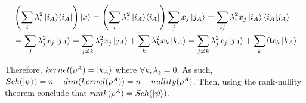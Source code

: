 \begin{enumerate}
    \begin{align}
        &\left( \sum_i \lambda_i^2 \mathop{\mathinner{ |{i_A}\rangle \langle{i_A}|}} \right) \ket{x}
        = \left( \sum_i \lambda_i^2 \mathop{\mathinner{ |{i_A}\rangle \langle{i_A}|}} \right) \sum_j x_j \ket{j_A}
        = \sum_{ij} \lambda_i^2 x_j \ket{i_A} \mathop{\mathinner{ \langle{i_A}|{j_A}\rangle}} \\
        &= \sum_j \lambda_j^2 x_j \ket{j_A}
        = \sum_{j \neq k} \lambda_j^2 x_j \ket{j_A} + \sum_k \lambda_k^2 x_k \ket{k_A}
        = \sum_{j \neq k} \lambda_j^2 x_j \ket{j_A} + \sum_k 0 x_k \ket{k_A}
    \end{align}
    
    Therefore, $kernel(\rho^A) = \ket{k_A}$ where $\forall k, \lambda_k = 0$.
    As such, $Sch(\ket{\psi}) = n - dim(kernel(\rho^A)) = n - nullity(\rho^A)$.
    Then, using the rank-nullity theorem conclude that $rank(\rho^A) = Sch(\ket{\psi})$.
        
    
\begin{comment}
    The rank equals the dimension of the rowspan ($Row(\rho^A)$) or columnspan ($Col(\rho^A)$).

    Initially, suppose that $\lambda_i \neq 0\ \forall i$,
    and $\ket{i_A} = \left[ \begin{matrix} i_0 \\ \vdots \\ i_n \end{matrix} \right]$.
    Then, find the rowspan.
    
    \begin{align}
        \rho^A = \sum_i \lambda_i^2 \ketbra{i_A}{i_A}
        = \left[ \begin{matrix}
            \sum_i \lambda_i^2 i_0 \bra{i_A} \\
            \vdots \\
            \sum_i \lambda_i^2 i_n \bra{i_A} \\
        \end{matrix} \right]
    \end{align}
    
    Therefore, the rowspan should be given by
    $\set{\sum_i \lambda_i^2 i_0 \bra{i_A}, \ldots, \sum_i \lambda_i^2 i_n \bra{i_A}}$.
    It is necessary to verify if the given set is linearly independent.
    Attempting to prove by contradiction, assume that the set is linearly dependent,
    and that $\forall i, \lambda_i \neq 0$.
    Hence, the dimension of $Row(\rho^A) \leq n - 1$.
    Thus, there exists at least one $j$, $\forall k\ t_k \in \mathbb{C}$, and
    $\exists k$ such that $k \neq j$, and $t_k \neq 0$ that satisfy
    

\end{comment}
\end{enumerate}
